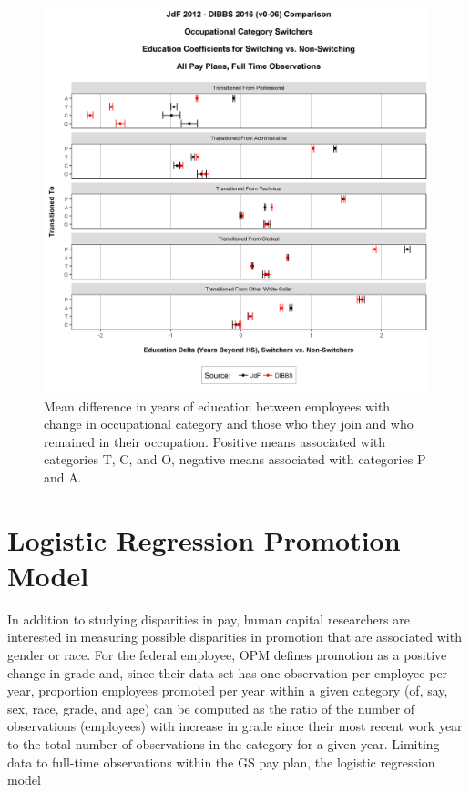 \documentclass[10pt, letterpaper]{article}
\begin{document}
\begin{spacing}{1.0}
\begin{figure}[h]
    \centering
    \includegraphics[width=6.5in, trim={0 0 0 1.5in}, clip]{OccCatTransitionVsNonTransAllPayPlansEd.png}
    \caption{Mean difference in years of education between employees with change in occupational category and those who they join and who remained in their occupation.  Positive means associated with categories T, C, and O, negative means associated with categories P and A.}
    \label{figure:OccCatTransitionVsNonTransAllPayPlansEd}
\end{figure}

\clearpage

\section{Logistic Regression Promotion Model}

In addition to studying disparities in pay, human capital researchers are interested in measuring possible disparities in promotion that are associated with gender or race.  For the federal employee, OPM defines promotion as a positive change in grade and, since their data set has one observation per employee per year, proportion employees promoted per year within a given category (of, say, sex, race, grade, and age) can be computed as the ratio of the number of observations (employees) with increase in grade since their most recent work year to the total number of observations in the category for a given year.  Limiting data to full-time observations within the GS pay plan, the logistic regression model\\[-14pt]


\end{spacing}
\end{document}
